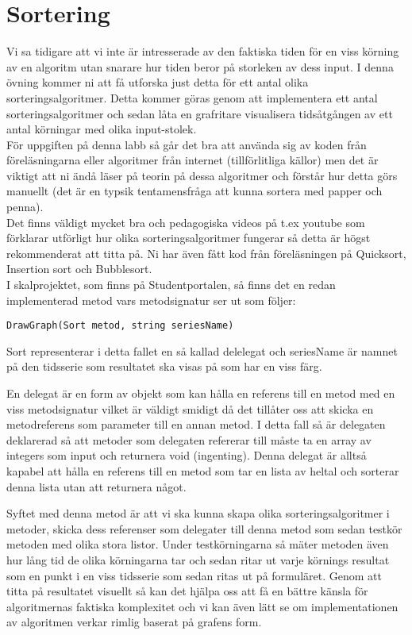 \documentclass{article}
\begin{document}
   
\section*{Sortering}
Vi sa tidigare att vi inte är intresserade av den faktiska tiden för en viss körning av en algoritm utan snarare hur tiden beror på storleken av dess input. I denna övning kommer ni att få utforska just detta för ett antal olika sorteringsalgoritmer. Detta kommer göras genom att implementera ett antal sorteringsalgoritmer och sedan låta en grafritare visualisera tidsåtgången av ett antal körningar med olika input-stolek. \\För uppgiften på denna labb så går det bra att använda sig av koden från föreläsningarna eller algoritmer från internet (tillförlitliga källor) men det är viktigt att ni ändå läser på teorin på dessa algoritmer och förstår hur detta görs manuellt (det är en typsik tentamensfråga att kunna sortera med papper och penna). \\Det finns väldigt mycket bra och pedagogiska videos på t.ex youtube som förklarar utförligt hur olika sorteringsalgoritmer fungerar så detta är högst rekommenderat att titta på. Ni har även fått kod från föreläsningen på Quicksort, Insertion sort och Bubblesort. \\

I skalprojektet, som finns på Studentportalen, så finns det en redan implementerad metod vars metodsignatur ser ut som följer: 
\begin{lstlisting}
DrawGraph(Sort metod, string seriesName) 
\end{lstlisting}

Sort representerar i detta fallet en så kallad delelegat och seriesName är namnet på den tidsserie som resultatet ska visas på som har en viss färg.

En delegat är en form av objekt som kan hålla en referens till en metod med en viss metodsignatur vilket är väldigt smidigt då det tillåter oss att skicka en metodreferens som parameter till en annan metod. 
I detta fall så är delegaten deklarerad så att metoder som delegaten refererar till måste ta en array av integers som input och returnera void (ingenting). Denna delegat är alltså kapabel att hålla en referens till en metod som tar en lista av heltal och sorterar denna lista utan att returnera något.

Syftet med denna metod är att vi ska kunna skapa olika sorteringsalgoritmer i metoder, skicka dess referenser som delegater till denna metod som sedan testkör metoden med olika stora listor. Under testkörningarna så mäter metoden även hur lång tid de olika körningarna tar och sedan ritar ut varje körnings resultat som en punkt i en viss tidsserie som sedan ritas ut på formuläret. Genom att titta på resultatet visuellt så kan det hjälpa oss att få en bättre känsla för algoritmernas faktiska komplexitet och vi kan även lätt se om implementationen av algoritmen verkar rimlig baserat på grafens form.\\
\end{document}
